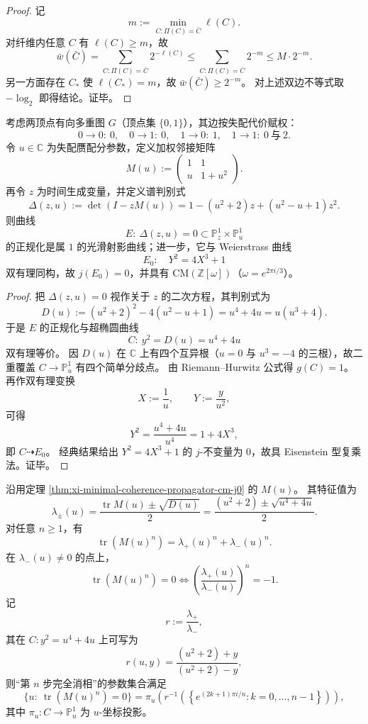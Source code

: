 \begin{proof}
记
\[
m:=\min_{C:\Pi(C)=\bar C}\ell(C).
\]
对纤维内任意 \(C\) 有 \(\ell(C)\ge m\)，故
\[
\bar w(\bar C)
=
\sum_{C:\Pi(C)=\bar C}2^{-\ell(C)}
\le
\sum_{C:\Pi(C)=\bar C}2^{-m}
\le
M\cdot 2^{-m}.
\]
另一方面存在 \(C_\ast\) 使 \(\ell(C_\ast)=m\)，故 \(\bar w(\bar C)\ge 2^{-m}\)。
对上述双边不等式取 \(-\log_2\) 即得结论。证毕。
\end{proof}

\begin{theorem}[最小相干传输子的谱曲线与 \(j=0\) 的 CM 椭圆曲线]\label{thm:xi-minimal-coherence-propagator-cm-j0}
考虑两顶点有向多重图 \(G\)（顶点集 \(\{0,1\}\)），其边按失配代价赋权：
\[
0\to 0:\ 0,\quad
0\to 1:\ 0,\quad
1\to 0:\ 1,\quad
1\to 1:\ 0\ \text{与}\ 2.
\]
令 \(u\in\mathbb C\) 为失配赝配分参数，定义加权邻接矩阵
\[
M(u):=
\begin{pmatrix}
1 & 1\\
u & 1+u^2
\end{pmatrix}.
\]
再令 \(z\) 为时间生成变量，并定义谱判别式
\[
\Delta(z,u):=\det(I-zM(u))
=1-(u^2+2)z+(u^2-u+1)z^2.
\]
则曲线
\[
E:\ \Delta(z,u)=0\subset \mathbb P^1_z\times\mathbb P^1_u
\]
的正规化是属 \(1\) 的光滑射影曲线；进一步，它与 Weierstrass 曲线
\[
E_0:\quad Y^2=4X^3+1
\]
双有理同构，故 \(j(E_0)=0\)，并具有 \(\mathrm{CM}(\mathbb Z[\omega])\)（\(\omega=e^{2\pi i/3}\)）。
\end{theorem}

\begin{proof}
把 \(\Delta(z,u)=0\) 视作关于 \(z\) 的二次方程，其判别式为
\[
D(u):=(u^2+2)^2-4(u^2-u+1)=u^4+4u=u(u^3+4).
\]
于是 \(E\) 的正规化与超椭圆曲线
\[
C:\ y^2=D(u)=u^4+4u
\]
双有理等价。
因 \(D(u)\) 在 \(\mathbb C\) 上有四个互异根（\(u=0\) 与 \(u^3=-4\) 的三根），故二重覆盖 \(C\to\mathbb P^1_u\) 有四个简单分歧点。
由 Riemann--Hurwitz 公式得 \(g(C)=1\)。
再作双有理变换
\[
X:=\frac{1}{u},
\qquad
Y:=\frac{y}{u^2},
\]
可得
\[
Y^2
=
\frac{u^4+4u}{u^4}
=
1+4X^3,
\]
即 \(C\dashrightarrow E_0\)。
经典结果给出 \(Y^2=4X^3+1\) 的 \(j\)-不变量为 \(0\)，故具 Eisenstein 型复乘法。证毕。
\end{proof}

\begin{proposition}[相干消相时刻的根单位判据]\label{prop:xi-minimal-propagator-root-of-unity-criterion}
沿用定理 \ref{thm:xi-minimal-coherence-propagator-cm-j0} 的 \(M(u)\)。
其特征值为
\[
\lambda_\pm(u)
=
\frac{\operatorname{tr}M(u)\pm\sqrt{D(u)}}{2}
=
\frac{(u^2+2)\pm\sqrt{u^4+4u}}{2}.
\]
对任意 \(n\ge 1\)，有
\[
\operatorname{tr}(M(u)^n)=\lambda_+(u)^n+\lambda_-(u)^n.
\]
在 \(\lambda_-(u)\neq 0\) 的点上，
\[
\operatorname{tr}(M(u)^n)=0
\iff
\left(\frac{\lambda_+(u)}{\lambda_-(u)}\right)^n=-1.
\]
记
\[
r:=\frac{\lambda_+}{\lambda_-},
\]
其在 \(C:y^2=u^4+4u\) 上可写为
\[
r(u,y)=\frac{(u^2+2)+y}{(u^2+2)-y},
\]
则“第 \(n\) 步完全消相”的参数集合满足
\[
\{u:\ \operatorname{tr}(M(u)^n)=0\}
=
\pi_u\!\left(
r^{-1}\!\left(\left\{e^{(2k+1)\pi i/n}:k=0,\dots,n-1\right\}\right)
\right),
\]
其中 \(\pi_u:C\to\mathbb P^1_u\) 为 \(u\)-坐标投影。
\end{proposition}


